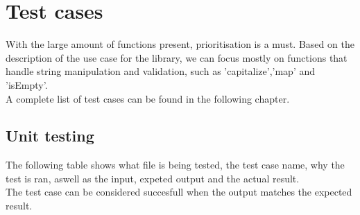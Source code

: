 \documentclass[a4paper, 12pt]{article}
\begin{document}
\section{Test cases}
With the large amount of functions present, prioritisation is a must.
Based on the description of the use case for the library, we can focus mostly on functions that handle string manipulation and validation,
such as 'capitalize','map' and 'isEmpty'.
\\
 A complete list of test cases can be found in the following chapter.


\subsection{Unit testing}

The following table shows what file is being tested, the test case name, why the test is ran, aswell as the 
input, expeted output and the actual result.
\\
The test case can be considered succesfull when the output matches the expected result.
\begin{table}[h]
\end{table}
\end{document}

